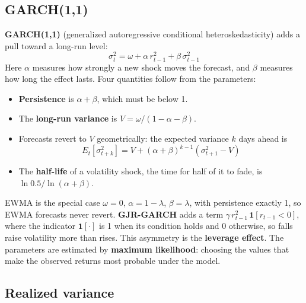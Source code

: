 \subsection{GARCH(1,1)}
\label{sec:14-garch}

\textbf{GARCH(1,1)} (generalized autoregressive conditional heteroskedasticity) adds a pull toward a long-run level:
\begin{equation}
  \sigma^2_t = \omega + \alpha\,r^2_{t-1} + \beta\,\sigma^2_{t-1}
  \label{eq:14-garch}
\end{equation}
Here $\alpha$ measures how strongly a new shock moves the forecast, and $\beta$ measures how long the effect lasts. Four quantities follow from the parameters:

\begin{itemize}
  \item \textbf{Persistence} is $\alpha + \beta$, which must be below 1.
  \item The \textbf{long-run variance} is $V = \omega / (1 - \alpha - \beta)$.
  \item Forecasts revert to $V$ geometrically: the expected variance $k$ days ahead is
  \begin{equation}
    E_t[\sigma^2_{t+k}] = V + (\alpha + \beta)^{k-1}\left(\sigma^2_{t+1} - V\right)
    \label{eq:14-forecast}
  \end{equation}
  \item The \textbf{half-life} of a volatility shock, the time for half of it to fade, is $\ln 0.5 / \ln(\alpha + \beta)$.
\end{itemize}

EWMA is the special case $\omega = 0$, $\alpha = 1 - \lambda$, $\beta = \lambda$, with persistence exactly 1, so EWMA forecasts never revert. \textbf{GJR-GARCH} adds a term $\gamma\,r^2_{t-1}\,\mathbf{1}[r_{t-1} < 0]$, where the indicator $\mathbf{1}[\cdot]$ is 1 when its condition holds and 0 otherwise, so falls raise volatility more than rises. This asymmetry is the \textbf{leverage effect}. The parameters are estimated by \textbf{maximum likelihood}: choosing the values that make the observed returns most probable under the model.

\subsection{Realized variance}
\label{sec:14-rv}

